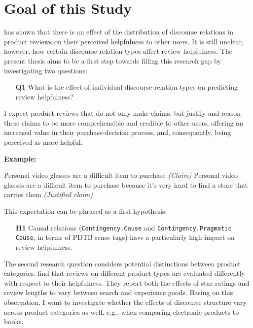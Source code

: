 \documentclass[
    a4paper,%
    12pt,%
    oneside,%
    toc=bibliography,
    final,
]{scrartcl}
\begin{document}
\section{Goal of this Study}
\label{sec:goal}

\citet{Golly2017} has shown that there is an effect of the distribution of discourse relations in product reviews on their perceived helpfulness to other users. It is still unclear, however, how certain discourse-relation types affect review helpfulness. The present thesis aims to be a first step towards filling this research gap by investigating two questions:

\begin{enumerate}[rightmargin=1cm]
\item[\textbf{Q1}] What is the effect of individual discourse-relation types on predicting review helpfulness?
\end{enumerate}

I expect product reviews that do not only make claims, but justify and reason these claims to be more comprehensible and credible to other users, offering an increased value in their purchase-decision process, and, consequently, being perceived as more helpful.

\textbf{Example:}
\vspace{-1em}

\begin{exe}
\ex Personal video glasses are a difficult item to purchase \textit{(Claim)}
\ex Personal video glasses are a difficult item to purchase because it’s very hard to find a store that carries them \textit{(Justified claim)}
\end{exe}
\vspace{-.5em}

This expectation can be phrased as a first hypothesis:

\begin{enumerate}[rightmargin=1cm]
\item[\textbf{H1}] Causal relations (\lstinline|Contingency.Cause| and \lstinline|Contingency.Pragmatic Cause|, in terms of PDTB sense tags) have a particularly high impact on review helpfulness.
\end{enumerate}

The second research question considers potential distinctions between product categories. \citet{MudambiSchuff2010} find that reviews on different product types are evaluated differently with respect to their helpfulness. They report both the effects of star ratings and review lengths to vary between search and experience goods. Basing on this observation, I want to investigate whether the effects of discourse structure vary across product categories as well, e.g., when comparing electronic products to books.
\end{document}
